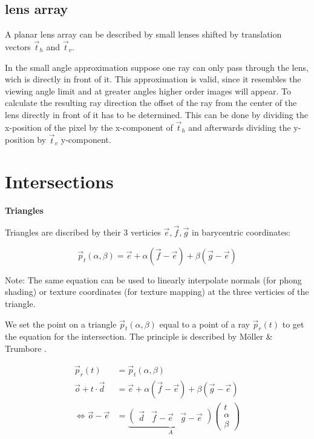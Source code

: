 \documentclass[11pt,a4paper,oneside]{article}
\begin{document}
\subsection{lens array}

A planar lens array can be described by small lenses shifted by translation vectors $\vec{t}_h$ and $\vec{t}_v$. 

In the small angle approximation suppose one ray can only pass through the lens, wich is directly in front of it. This approximation is valid, since it resembles the viewing angle limit and at greater angles higher order images will appear. To calculate the resulting ray direction the offset of the ray from the center of the lens directly in front of it has to be determined. This can be done by dividing the x-position of the pixel by the x-component of $\vec{t}_h$ and afterwards dividing the y-position by $\vec{t}_v$ y-component.

\section{Intersections}

\textbf{Triangles}

Triangles are discribed by their 3 verticies $\vec{e},\vec{f},\vec{g}$ in barycentric coordinates:

\begin{equation}
\vec{p}_t(\alpha,\beta) = \vec{e} + \alpha (\vec{f} - \vec{e}) + \beta (\vec{g} - \vec{e})
\end{equation}

Note:
The same equation can be used to linearly interpolate normals (for phong shading) or texture coordinates (for texture mapping) at the three verticies of the triangle.

We set the point on a triangle $\vec{p}_t(\alpha,\beta)$ equal to a point of a ray $\vec{p}_r(t)$ to get the equation for the intersection. The principle is described by Möller \& Trumbore \cite{moller1997fast}.

\begin{align}
\vec{p}_r(t) &= \vec{p}_t(\alpha,\beta) \\
\vec{o} + t \cdot \vec{d} &= \vec{e} + \alpha (\vec{f} - \vec{e}) + \beta (\vec{g} - \vec{e}) \\
\Leftrightarrow \vec{o} - \vec{e} &= \underbrace{ \begin{pmatrix} \vec{d} & \vec{f} - \vec{e} & \vec{g} - \vec{e} \end{pmatrix} }_{A} \begin{pmatrix} t \\ \alpha \\ \beta \end{pmatrix}
\end{align}
\end{document}
